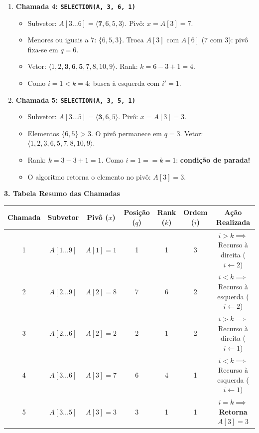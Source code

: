 \documentclass[10pt,a4paper]{article}
\newcommand{\topico}[1]{\smallskip\noindent\textbf{\color{azul}#1}\par}
\begin{document}
\begin{enumerate}
    \item \textbf{Chamada 4: \texttt{SELECTION(A, 3, 6, 1)}}
    \begin{itemize}
        \setlength{\itemsep}{0pt}
        \item Subvetor: $A[3 \dots 6] = \langle \mathbf{7}, 6, 5, 3 \rangle$. Pivô: $x = A[3] = 7$.
        \item Menores ou iguais a $7$: $\{6, 5, 3\}$. Troca $A[3]$ com $A[6]$ ($7$ com $3$): pivô fixa-se em $q = 6$.
        \item Vetor: $\langle 1, 2, \mathbf{3, 6, 5}, \underline{7}, 8, 10, 9 \rangle$. Rank: $k = 6 - 3 + 1 = 4$.
        \item Como $i = 1 < k = 4$: busca à esquerda com $i' = 1$.
    \end{itemize}

    \item \textbf{Chamada 5: \texttt{SELECTION(A, 3, 5, 1)}}
    \begin{itemize}
        \setlength{\itemsep}{0pt}
        \item Subvetor: $A[3 \dots 5] = \langle \mathbf{3}, 6, 5 \rangle$. Pivô: $x = A[3] = 3$.
        \item Elementos $\{6, 5\} > 3$. O pivô permanece em $q = 3$. Vetor: $\langle 1, 2, \underline{3}, 6, 5, 7, 8, 10, 9 \rangle$.
        \item Rank: $k = 3 - 3 + 1 = 1$. Como $i = 1 == k = 1$: \textbf{condição de parada!}
        \item O algoritmo retorna o elemento no pivô: $A[3] = 3$.
    \end{itemize}
\end{enumerate}

\topico{3. Tabela Resumo das Chamadas}
\begin{center}
\footnotesize
\setlength{\tabcolsep}{5pt}
\begin{tabular}{ccccccc}
\toprule
\textbf{Chamada} & \textbf{Subvetor} & \textbf{Pivô ($x$)} & \textbf{Posição ($q$)} & \textbf{Rank ($k$)} & \textbf{Ordem ($i$)} & \textbf{Ação Realizada} \\ \midrule
1 & $A[1 \dots 9]$ & $A[1]=1$ & 1 & 1 & 3 & $i > k \implies$ Recurso à direita ($i \leftarrow 2$) \\
2 & $A[2 \dots 9]$ & $A[2]=8$ & 7 & 6 & 2 & $i < k \implies$ Recurso à esquerda ($i \leftarrow 2$) \\
3 & $A[2 \dots 6]$ & $A[2]=2$ & 2 & 1 & 2 & $i > k \implies$ Recurso à direita ($i \leftarrow 1$) \\
4 & $A[3 \dots 6]$ & $A[3]=7$ & 6 & 4 & 1 & $i < k \implies$ Recurso à esquerda ($i \leftarrow 1$) \\
5 & $A[3 \dots 5]$ & $A[3]=3$ & 3 & 1 & 1 & \textbf{$i = k \implies$ Retorna $A[3] = 3$} \\
\bottomrule
\end{tabular}
\end{center}
\end{document}
